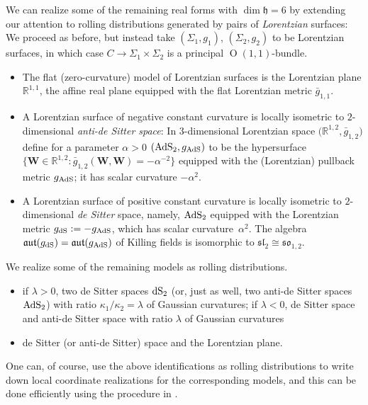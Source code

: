 \documentclass[pdftex]{sigma}
\newcommand{\bbR}{\mathbb{R}}
\newcommand{\mbW}{\mathbf{W}}
\newcommand{\mfh} {\mathfrak{h}}
\newcommand{\mfaut}{\mathfrak{aut}}
\newcommand{\mfsl} {\mathfrak{sl}}
\newcommand{\mfso} {\mathfrak{so}}
\numberwithin{equation}{section}
\begin{document}
 We can realize some of the remaining real forms with $\dim \mfh = 6$ by extending our attention to rolling distributions generated by pairs of \textit{Lorentzian} surfaces: We proceed as before, but instead take $(\Sigma_1, g_1)$, $(\Sigma_2, g_2)$ to be Lorentzian surfaces, in which case $C \to \Sigma_1 \times \Sigma_2$ is a principal $\operatorname{O}(1, 1)$-bundle.
\begin{itemize}\itemsep=0pt
 \item The flat (zero-curvature) model of Lorentzian surfaces is the Lorentzian plane $\bbR^{1, 1}$, the affine real plane equipped with the flat Lorentzian metric $\bar g_{1, 1}$.
 \item A Lorentzian surface of negative constant curvature is locally isometric to $2$-dimensional \textit{anti-de Sitter space}: In $3$-dimensional Lorentzian space $\big(\bbR^{1, 2}, \bar g_{1, 2}\big)$ define for a parameter $\alpha > 0$ $({\rm AdS}_2, g_{{\rm AdS}})$ to be the hypersurface $\big\{\mbW \in \bbR^{1, 2} \colon \bar g_{1, 2}(\mbW, \mbW) = -\alpha^{-2} \big\}$ equipped with the (Lorentzian) pullback metric $g_{{\rm AdS}}$; it has scalar curvature $-\alpha^2$.
 \item A Lorentzian surface of positive constant curvature is locally isometric to $2$-dimensional \textit{de Sitter} space, namely, ${\rm AdS}_2$ equipped with the Lorentzian metric $g_{{\rm dS}} := -g_{{\rm AdS}}$, which has scalar curvature~$\alpha^2$. The algebra $\mfaut(g_{{\rm dS}}) = \mfaut(g_{{\rm AdS}})$ of Killing fields is isomorphic to $\mfsl_2 \cong \mfso_{1, 2}$.
\end{itemize}

We realize some of the remaining models as rolling distributions.
\begin{itemize}[leftmargin=1.5cm]\itemsep=0pt
	\item[$\mathbf{D.6}_{\lambda}^{2-}$] if $\lambda > 0$, two de Sitter spaces ${\rm dS}_2$ (or, just as well, two anti-de Sitter spaces ${\rm AdS}_2$) with ratio $\kappa_1 / \kappa_2 = \lambda$ of Gaussian curvatures; if $\lambda < 0$, de Sitter space and anti-de Sitter space with ratio $\lambda$ of Gaussian curvatures \item[$\mathbf{D.6}_{\infty}^1$] de Sitter (or anti-de Sitter) space and the Lorentzian plane.
\end{itemize}

One can, of course, use the above identifications as rolling distributions to write down local coordinate realizations for the corresponding models, and this can be done efficiently using the procedure in \cite[Section~2]{AnNurowski}.
\end{document}
